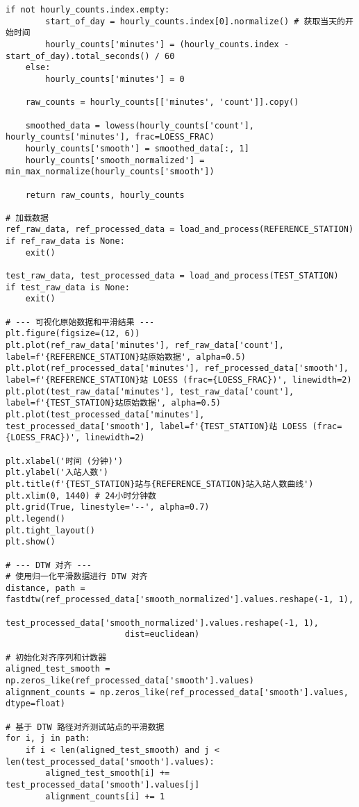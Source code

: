 \begin{lstlisting}[caption={求解 $P(t)$}]
    if not hourly_counts.index.empty:
        start_of_day = hourly_counts.index[0].normalize() # 获取当天的开始时间
        hourly_counts['minutes'] = (hourly_counts.index - start_of_day).total_seconds() / 60
    else:
        hourly_counts['minutes'] = 0

    raw_counts = hourly_counts[['minutes', 'count']].copy()

    smoothed_data = lowess(hourly_counts['count'], hourly_counts['minutes'], frac=LOESS_FRAC)
    hourly_counts['smooth'] = smoothed_data[:, 1]
    hourly_counts['smooth_normalized'] = min_max_normalize(hourly_counts['smooth'])

    return raw_counts, hourly_counts

# 加载数据
ref_raw_data, ref_processed_data = load_and_process(REFERENCE_STATION)
if ref_raw_data is None:
    exit()

test_raw_data, test_processed_data = load_and_process(TEST_STATION)
if test_raw_data is None:
    exit()

# --- 可视化原始数据和平滑结果 ---
plt.figure(figsize=(12, 6))
plt.plot(ref_raw_data['minutes'], ref_raw_data['count'], label=f'{REFERENCE_STATION}站原始数据', alpha=0.5)
plt.plot(ref_processed_data['minutes'], ref_processed_data['smooth'], label=f'{REFERENCE_STATION}站 LOESS (frac={LOESS_FRAC})', linewidth=2)
plt.plot(test_raw_data['minutes'], test_raw_data['count'], label=f'{TEST_STATION}站原始数据', alpha=0.5)
plt.plot(test_processed_data['minutes'], test_processed_data['smooth'], label=f'{TEST_STATION}站 LOESS (frac={LOESS_FRAC})', linewidth=2)

plt.xlabel('时间 (分钟)')
plt.ylabel('入站人数')
plt.title(f'{TEST_STATION}站与{REFERENCE_STATION}站入站人数曲线')
plt.xlim(0, 1440) # 24小时分钟数
plt.grid(True, linestyle='--', alpha=0.7)
plt.legend()
plt.tight_layout()
plt.show()

# --- DTW 对齐 ---
# 使用归一化平滑数据进行 DTW 对齐
distance, path = fastdtw(ref_processed_data['smooth_normalized'].values.reshape(-1, 1),
                        test_processed_data['smooth_normalized'].values.reshape(-1, 1),
                        dist=euclidean)

# 初始化对齐序列和计数器
aligned_test_smooth = np.zeros_like(ref_processed_data['smooth'].values)
alignment_counts = np.zeros_like(ref_processed_data['smooth'].values, dtype=float)

# 基于 DTW 路径对齐测试站点的平滑数据
for i, j in path:
    if i < len(aligned_test_smooth) and j < len(test_processed_data['smooth'].values):
        aligned_test_smooth[i] += test_processed_data['smooth'].values[j]
        alignment_counts[i] += 1


\end{lstlisting}
